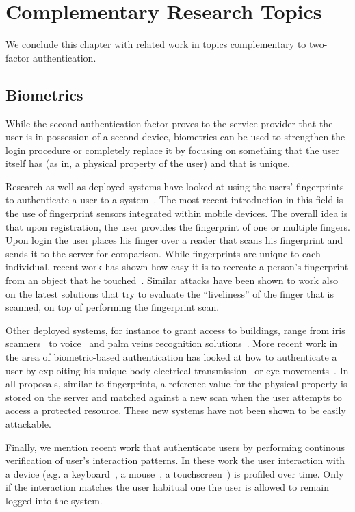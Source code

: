 \section{Complementary Research Topics}

We conclude this chapter with related work in topics complementary to two-factor authentication.

\subsection{Biometrics}

While the second authentication factor proves to the service provider that the user is in possession of a second device, biometrics can be used to strengthen the login procedure or completely replace it by focusing on something that the user itself has (as in, a physical property of the user) and that is unique. 

Research as well as deployed systems have looked at using the users' fingerprints to authenticate a user to a system~\cite{fingerprint}. The most recent introduction in this field is the use of fingerprint sensors integrated within mobile devices. The overall idea is that upon registration, the user provides the fingerprint of one or multiple fingers. Upon login the user places his finger over a reader that scans his fingerprint and sends it to the server for comparison. While fingerprints are unique to each individual, recent work has shown how easy it is to recreate a person's fingerprint from an object that he touched~\cite{cccfingerprintoriginal,cccfingerprint}. Similar attacks have been shown to work also on the latest solutions that try to evaluate the ``liveliness'' of the finger that is scanned, on top of performing the fingerprint scan.

Other deployed systems, for instance to grant access to buildings, range from iris scanners~\cite{eyelock} to voice~\cite{nuanceauth} and palm veins recognition solutions~\cite{fujitsupalm,m2syspalm}. More recent work in the area of biometric-based authentication has looked at how to authenticate a user by exploiting his unique body electrical transmission~\cite{rasmussenpulse} or eye movements~\cite{rasmussen15}. In all proposals, similar to fingerprints, a reference value for the physical property is stored on the server and matched against a new scan when the user attempts to access a protected resource. These new systems have not been shown to be easily attackable.

Finally, we mention recent work that authenticate users by performing continous verification of user's interaction patterns. In these work the user interaction with a device (e.g. a keyboard~\cite{keyboardbiometrics}, a mouse~\cite{mousebiometrics}, a touchscreen~\cite{touchscreenbiometrics}) is profiled over time. Only if the interaction matches the user habitual one the user is allowed to remain logged into the system. 

